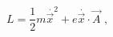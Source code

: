 \begin{equation}
L=\frac{1}{2}m\overset{\cdot}{\vec{x}}^{2}+e\overset{\cdot}{\vec{x}}\cdot
\vec{A}\text{ ,}\label{2}%
\end{equation}


